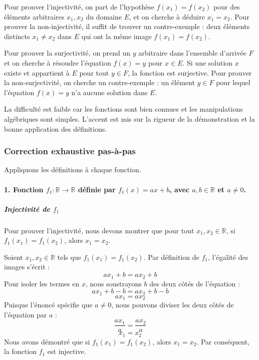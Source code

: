 \documentclass[12pt,a4paper]{report}
\begin{document}
Pour prouver l'injectivité, on part de l'hypothèse \(f(x_1) = f(x_2)\)
pour des éléments arbitraires \(x_1, x_2\) du domaine \(E\), et on
cherche à déduire \(x_1 = x_2\). Pour prouver la non-injectivité, il
suffit de trouver un contre-exemple : deux éléments distincts
\(x_1 \neq x_2\) dans \(E\) qui ont la même image \(f(x_1) = f(x_2)\).

Pour prouver la surjectivité, on prend un \(y\) arbitraire dans
l'ensemble d'arrivée \(F\) et on cherche à résoudre l'équation
\(f(x) = y\) pour \(x \in E\). Si une solution \(x\) existe et
appartient à \(E\) pour tout \(y \in F\), la fonction est surjective.
Pour prouver la non-surjectivité, on cherche un contre-exemple : un
élément \(y \in F\) pour lequel l'équation \(f(x) = y\) n'a aucune
solution dans \(E\).

La difficulté est faible car les fonctions sont bien connues et les
manipulations algébriques sont simples. L'accent est mis sur la rigueur
de la démonstration et la bonne application des définitions.

\subsubsection{Correction exhaustive
pas-à-pas}\label{correction-exhaustive-pas-uxe0-pas}

Appliquons les définitions à chaque fonction.

\paragraph{\texorpdfstring{1. Fonction
\(f_1: \mathbb{R} \to \mathbb{R}\) définie par \(f_1(x) = ax+b\), avec
\(a, b \in \mathbb{R}\) et
\(a \neq 0\).}{1. Fonction f\_1: \textbackslash mathbb\{R\} \textbackslash to \textbackslash mathbb\{R\} définie par f\_1(x) = ax+b, avec a, b \textbackslash in \textbackslash mathbb\{R\} et a \textbackslash neq 0.}}\label{fonction-f_1-mathbbr-to-mathbbr-duxe9finie-par-f_1x-axb-avec-a-b-in-mathbbr-et-a-neq-0.}

\subparagraph{\texorpdfstring{Injectivité de
\(f_1\)}{Injectivité de f\_1}}\label{injectivituxe9-de-f_1}

Pour prouver l'injectivité, nous devons montrer que pour tout
\(x_1, x_2 \in \mathbb{R}\), si \(f_1(x_1) = f_1(x_2)\), alors
\(x_1 = x_2\).

Soient \(x_1, x_2 \in \mathbb{R}\) tels que \(f_1(x_1) = f_1(x_2)\). Par
définition de \(f_1\), l'égalité des images s'écrit :
\[ax_1 + b = ax_2 + b\] Pour isoler les termes en \(x\), nous
soustrayons \(b\) des deux côtés de l'équation :
\[ax_1 + b - b = ax_2 + b - b\] \[ax_1 = ax_2\] Puisque l'énoncé
spécifie que \(a \neq 0\), nous pouvons diviser les deux côtés de
l'équation par \(a\) : \[\frac{ax_1}{a} = \frac{ax_2}{a}\] \[x_1 = x_2\]
Nous avons démontré que si \(f_1(x_1) = f_1(x_2)\), alors \(x_1 = x_2\).
Par conséquent, la fonction \(f_1\) est injective.
\end{document}

